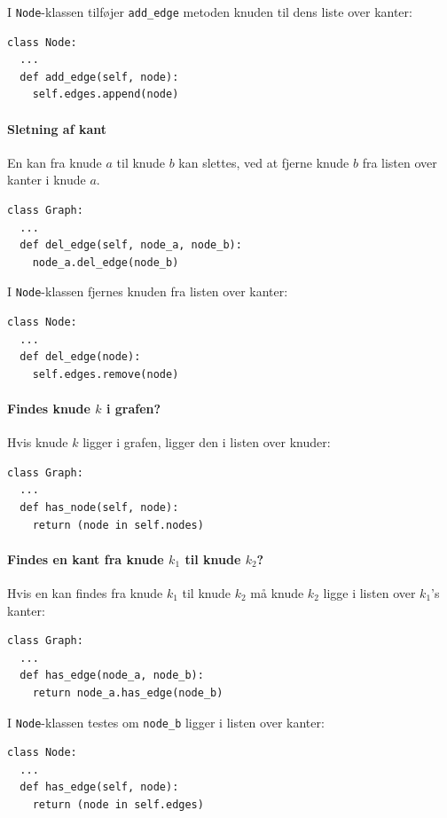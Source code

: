 \documentclass[10pt,a4paper,danish]{article}
\newcommand{\ct}{\texttt}
\begin{document}
I \ct{Node}-klassen tilføjer \ct{add\_edge} metoden knuden til dens
liste over kanter:
{\small
\begin{verbatim}
class Node:
  ...
  def add_edge(self, node):
    self.edges.append(node)
\end{verbatim}}

\paragraph{Sletning af kant}
En kan fra knude $a$ til knude $b$ kan slettes, ved at fjerne knude
$b$ fra listen over kanter i knude $a$.

{\small
\begin{verbatim}
class Graph:
  ...
  def del_edge(self, node_a, node_b):
    node_a.del_edge(node_b)
\end{verbatim}}

I \ct{Node}-klassen fjernes knuden fra listen over kanter:
{\small
\begin{verbatim}
class Node:
  ...
  def del_edge(node):
    self.edges.remove(node)
\end{verbatim}}


\paragraph{Findes knude $k$ i grafen?}
Hvis knude $k$ ligger i grafen, ligger den i listen over knuder:

{\small
\begin{verbatim}
class Graph:
  ...
  def has_node(self, node):
    return (node in self.nodes)
\end{verbatim}}

\paragraph{Findes en kant fra knude $k_1$ til knude $k_2$?}
Hvis en kan findes fra knude $k_1$ til knude $k_2$ må knude $k_2$
ligge i listen over $k_1$'s kanter:
{\small
\begin{verbatim}
class Graph:
  ...
  def has_edge(node_a, node_b):
    return node_a.has_edge(node_b)
\end{verbatim}}

I \ct{Node}-klassen testes om \ct{node\_b} ligger i listen over kanter:
{\small
\begin{verbatim}
class Node:
  ...
  def has_edge(self, node):
    return (node in self.edges)
\end{verbatim}}
\end{document}
